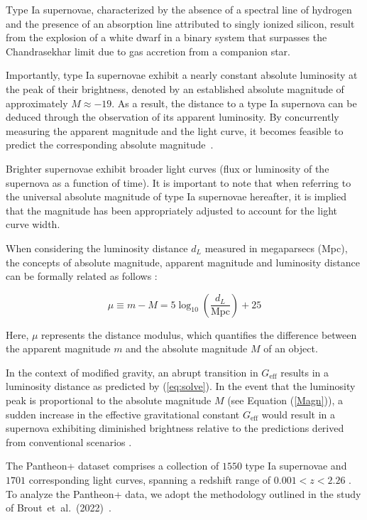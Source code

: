\documentclass[universe,article,accept,moreauthors,pdftex]{Definitions/mdpi}
\begin{document}
Type Ia supernovae, characterized by the absence of a spectral line of hydrogen and the presence of an absorption line attributed to singly ionized silicon, result from the explosion of a white dwarf in a binary system that surpasses the Chandrasekhar limit due to gas accretion from a companion star.

Importantly, type Ia supernovae exhibit a nearly constant absolute luminosity at the peak of their brightness, denoted by an established absolute magnitude of approximately $M \approx -19$. As a result, the distance to a type Ia supernova can be deduced through the observation of its apparent luminosity. By concurrently measuring the apparent magnitude and the light curve, it becomes feasible to predict the corresponding absolute \mbox{magnitude \cite{amendola_tsujikawa_2010}}.

Brighter supernovae exhibit broader light curves (flux or luminosity of the supernova as a function of time). It is important to note that when referring to the universal absolute magnitude of type Ia supernovae hereafter, it is implied that the magnitude has been appropriately adjusted to account for the light curve width.

When considering the luminosity distance $d_{L}$ measured in megaparsecs (Mpc), the concepts of absolute magnitude, apparent magnitude and luminosity distance can be formally related as follows \cite{amendola_tsujikawa_2010}:

\begin{equation}\label{Magn}
\mu \equiv m - M = 5 \log_{10}\left(\frac{d_{L}}{\text{Mpc}}\right) + 25
\end{equation}

Here, $\mu$ represents the distance modulus, which quantifies the difference between the apparent magnitude $m$ and the absolute magnitude $M$ of an object. 

In the context of modified gravity, an abrupt transition in $G_{\text{eff}}$ results in a luminosity distance as predicted by (\ref{eq:solve}). In the event that the luminosity peak is proportional to the absolute magnitude $M$ \cite{Gaztanaga:2001fh} (see Equation (\ref{Magn})), a sudden increase in the effective gravitational constant $G_{\text{eff}}$ would result in a supernova exhibiting diminished brightness relative to the predictions derived from conventional scenarios \cite{Perivolaropoulos:2023iqj}.

The Pantheon+ dataset comprises a collection of $1550$ type Ia supernovae and $1701$ corresponding light curves, spanning a redshift range of $0.001<z<2.26$ \cite{Brout:2022vxf}. To analyze the Pantheon+ data, we adopt the methodology outlined in the study of \mbox{Brout et al. (2022) \cite{Brout:2022vxf}.}
 
\end{document}
